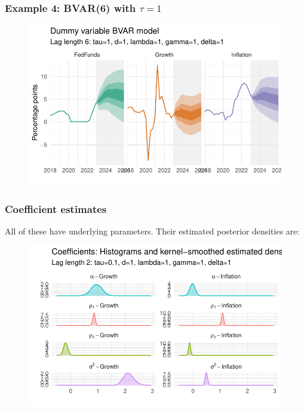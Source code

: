 \documentclass[
  letterpaper,
]{book}
\begin{document}
\hypertarget{example-4-bvar6-with-tau1}{%
\subsubsection{\texorpdfstring{Example 4: BVAR(6) with
\(\tau=1\)}{Example 4: BVAR(6) with \textbackslash tau=1}}\label{example-4-bvar6-with-tau1}}

\begin{figure}

{\centering \includegraphics{BVAR_files/figure-pdf/estim-1.pdf}

}

\end{figure}

\hypertarget{coefficient-estimates}{%
\subsubsection{Coefficient estimates}\label{coefficient-estimates}}

All of these have underlying parameters. Their estimated posterior
densities are:

\begin{figure}

{\centering \includegraphics{BVAR_files/figure-pdf/unnamed-chunk-9-1.pdf}

}

\end{figure}
\end{document}
